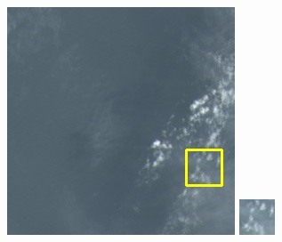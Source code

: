\documentclass[10pt,UTF8,fntef]{ctexart}
\begin{document}
\begin{figure}[H]
{{\begin{minipage}[b]{0.15\linewidth}
            \includegraphics[width=1\linewidth]{../log/spoon3/cut/LC81570452014213LGN00_06142_color.jpg}\vspace{4pt}
            \includegraphics[width=1\linewidth]{../log/spoon3/cut/tmp_cut_LC81570452014213LGN00_06142_color.jpg}\vspace{4pt}

\end{minipage}}}
\end{figure}
\end{document}
